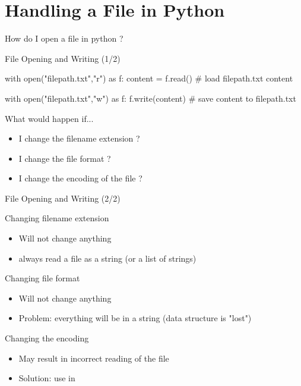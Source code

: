 \documentclass[serif, aspectratio=169]{beamer}
\begin{document}
\section{Handling a File in Python}

\begin{exoframe}
    \begin{center}
        \Large
        How do I open a file in python ?
    \end{center}
\end{exoframe}

\begin{frame}[fragile]{File Opening and Writing (1/2)}
    \begin{pythoncode}
    with open("filepath.txt","r") as f:
        content = f.read() # load filepath.txt content

    with open("filepath.txt","w") as f:
        f.write(content) # save content to filepath.txt
    \end{pythoncode}
    \vfill
    \begin{block}{What would happen if...}
        \begin{itemize}
            \item I change the filename extension ?
            \item I change the file format ?
            \item I change the encoding of the file ?
        \end{itemize}
    \end{block}
\end{frame}

\begin{frame}{File Opening and Writing (2/2)}
    \begin{block}{Changing filename extension}
        \begin{itemize}
            \item Will not change anything
            \item {} always read a file as a string (or a list of strings)
        \end{itemize}
    \end{block}
    \begin{block}{Changing file format}
        \begin{itemize}
            \item Will not change anything
            \item Problem: everything will be in a string (data structure is "lost")
        \end{itemize}
    \end{block}
    \begin{block}{Changing the encoding}
        \begin{itemize}
            \item May result in incorrect reading of the file
            \item Solution: use  in 
        \end{itemize}
    \end{block}
\end{frame}
\end{document}
